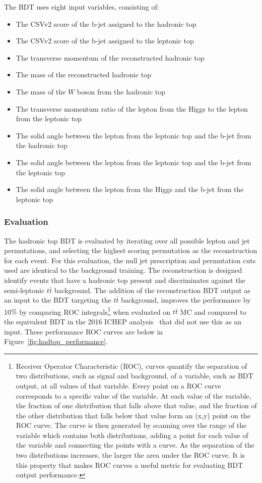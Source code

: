The BDT uses eight input variables, consisting of:
\begin{itemize}
\item The CSVv2 score of the b-jet assigned to the hadronic top
\item The CSVv2 score of the b-jet assigned to the leptonic top
\item The transverse momentum of the reconstructed hadronic top
\item The mass of the reconstructed hadronic top
\item The mass of the $W$ boson from the hadronic top
\item The transverse momentum ratio of the lepton from the Higgs to the lepton from the leptonic top
\item The solid angle between the lepton from the leptonic top and the b-jet from the hadronic top
\item The solid angle between the lepton from the leptonic top and the b-jet from the leptonic top
\item The solid angle between the lepton from the Higgs and the b-jet from the leptonic top
\end{itemize}

\subsubsection{Evaluation}
The hadronic top BDT is evaluated by iterating over all possible lepton and jet
permutations, and selecting the highest scoring permutation as the reconstruction for
each event. For this evaluation, the null jet prescription and permutation
cuts used are identical to the background training.
The reconstruction is designed identify events that have a hadronic top present and
discriminates against the semi-leptonic $t\bar{t}$ background. The addition of the 
reconstruction BDT output as an input to the BDT targeting the $t\bar{t}$ background,
improves the performance by 10$\%$ by comparing ROC integrals\footnote{Receiver Operator Characteristic (ROC), curves quantify the separation of two distributions, such as signal and background,
of a variable, such as BDT output, at all values of that variable. Every point on a ROC curve corresponds to a specific value of the variable. At each value of the variable, the fraction of one
distribution that falls above that value, and the fraction of the other distribution that falls below that value form an (x,y) point on the ROC curve. The curve is then generated by scanning over
the range of the variable which contains both distributions, adding a point for each value of the variable and connecting the points with a curve. As the separation of the two distributions increases,
the larger the area under the ROC curve. It is this property that makes ROC curves a useful metric for evaluating BDT output performance.}
when evaluated on $t\bar{t}$ MC and compared to the
equivalent BDT in the 2016 \tth ICHEP analysis~\cite{CMS-AN-16-022} that did not use this
as an input. These performance ROC curves are below in Figure~\ref{fig:hadtop_performance}.

